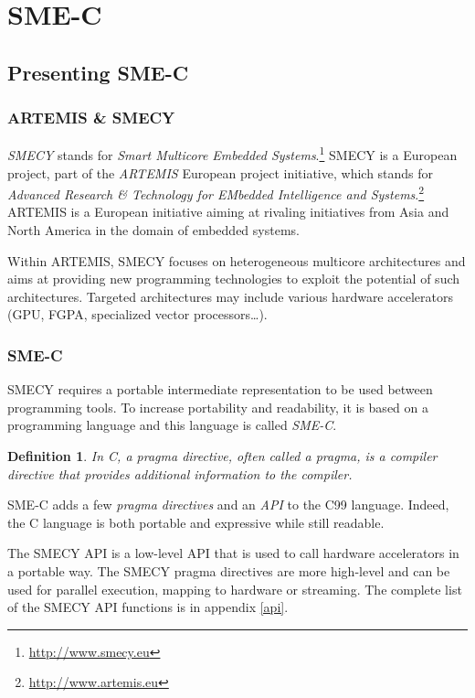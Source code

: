 \documentclass[a4paper]{article}
\newtheorem{defdef}{Definition}
\begin{document}
\section{SME-C}
	\subsection{Presenting SME-C}
	\subsubsection{ARTEMIS \& SMECY}
 	\emph{SMECY} stands for \emph{Smart Multicore Embedded
      Systems}.\footnote{\url{http://www.smecy.eu}} SMECY is a European
    project, part of the \emph{ARTEMIS} European project initiative, which stands for \emph{Advanced Research \& Technology for EMbedded Intelligence and Systems}.\footnote{\url{http://www.artemis.eu}} ARTEMIS is a European initiative aiming at rivaling initiatives from Asia and North America in the domain of embedded systems.

	Within ARTEMIS, SMECY focuses on heterogeneous multicore architectures and aims at providing new programming technologies to exploit the potential of such architectures. Targeted architectures may include various hardware accelerators (GPU, FGPA, specialized vector processors\ldots).

	\subsubsection{SME-C}
	SMECY requires a portable intermediate representation to be used
    between programming tools. To increase portability and readability, it
    is based on a programming language and this language is called
    \emph{SME-C}.

	\begin{defdef} In C, a \emph{pragma directive}, often called a \emph{pragma}, is a compiler directive that provides additional information to the compiler.
	\end{defdef}
	
	SME-C adds a few \emph{pragma directives} and an \emph{API} to the C99 language. Indeed, the C language is both portable and expressive while still readable.
	
	The SMECY API is a low-level API that is used to call hardware
    accelerators in a portable way. The SMECY pragma directives are more
    high-level and can be used for parallel execution, mapping to hardware
    or streaming. The complete list of the SMECY API functions is in
    appendix \ref{api}.
\end{document}
